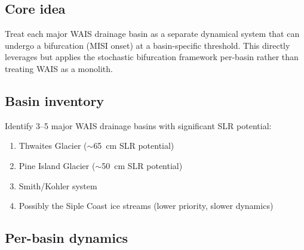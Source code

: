 \documentclass[11pt]{article}
\begin{document}
\subsection{Core idea}

Treat each major WAIS drainage basin as a separate dynamical system that can undergo a bifurcation (MISI onset) at a basin-specific threshold.  This directly leverages \citet{robel2019marine} but applies the stochastic bifurcation framework per-basin rather than treating WAIS as a monolith.

\subsection{Basin inventory}

Identify 3--5 major WAIS drainage basins with significant SLR potential:
\begin{enumerate}
  \item Thwaites Glacier ($\sim$65~cm SLR potential)
  \item Pine Island Glacier ($\sim$50~cm SLR potential)
  \item Smith/Kohler system
  \item Possibly the Siple Coast ice streams (lower priority, slower dynamics)
\end{enumerate}

\subsection{Per-basin dynamics}
\end{document}
